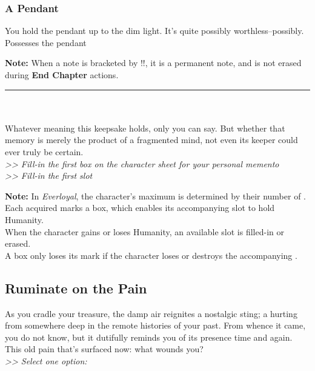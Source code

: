\begin{multicols}{2}
\subsubsection*{A Pendant}
You hold the pendant up to the dim light. It’s quite possibly worthless--possibly.\\
 Possesses the pendant
\begin{tcolorbox}
\textbf{Note:} When a note is bracketed by !!, it is a permanent note, and is not erased during \textbf{End Chapter} actions.
\end{tcolorbox}
\end{multicols}
\hrule
\ \\
\ \\
Whatever meaning this keepsake holds, only you can say. But whether that memory is merely the product of a fragmented mind, not even its keeper could ever truly be certain.\\
\emph{>> Fill-in the first  box on the character sheet for your personal memento\\
>> Fill-in the first  slot}
\begin{tcolorbox}
\textbf{Note:} In \emph{Everloyal}, the character’s maximum  is determined by their number of . Each acquired  marks a  box, which enables its accompanying  slot to hold Humanity.\\
When the character gains or loses Humanity, an available  slot is filled-in or erased.\\
A  box only loses its mark if the character loses or destroys the accompanying .
\end{tcolorbox}

\subsection*{Ruminate on the Pain}
As you cradle your treasure, the damp air reignites a nostalgic sting; a hurting from somewhere deep in the remote histories of your past. From whence it came, you do not know, but it dutifully reminds you of its presence time and again. This old pain that’s surfaced now: what wounds you?\\
\emph{>> Select one option:}

